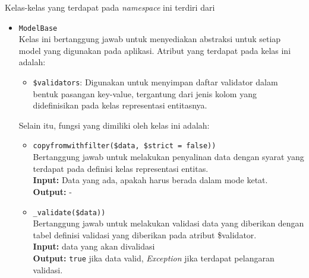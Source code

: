     Kelas-kelas yang terdapat pada \textit{namespace} ini terdiri dari
    \begin{itemize}
        \item \texttt{ModelBase} \\
            Kelas ini bertanggung jawab untuk menyediakan abstraksi untuk setiap model yang digunakan
            pada aplikasi.
            Atribut yang terdapat pada kelas ini adalah:
            \begin{itemize}
                \item \texttt{\$validators}: Digunakan untuk menyimpan daftar validator dalam bentuk
                    pasangan key-value, tergantung dari jenis kolom yang didefinisikan
                    pada kelas representasi entitasnya.
            \end{itemize}
            Selain itu, fungsi yang dimiliki oleh kelas ini adalah:
            \begin{itemize}
                \item \texttt{copyfromwithfilter(\$data, \$strict = false))}\\
                    Bertanggung jawab untuk melakukan penyalinan data dengan syarat yang terdapat
                    pada definisi kelas representasi entitas.\\
                    \textbf{Input:} Data yang ada, apakah harus berada dalam mode ketat.\\
                    \textbf{Output:} -
                    
                \item \texttt{\_validate(\$data))}\\
                    Bertanggung jawab untuk melakukan validasi data yang diberikan dengan
                    tabel definisi validasi yang diberikan pada atribut \$validator.\\
                    \textbf{Input:} data yang akan divalidasi\\
                    \textbf{Output:} \texttt{true} jika data valid, \textit{Exception} jika terdapat
                        pelangaran validasi.
            \end{itemize}
            

\end{itemize}
